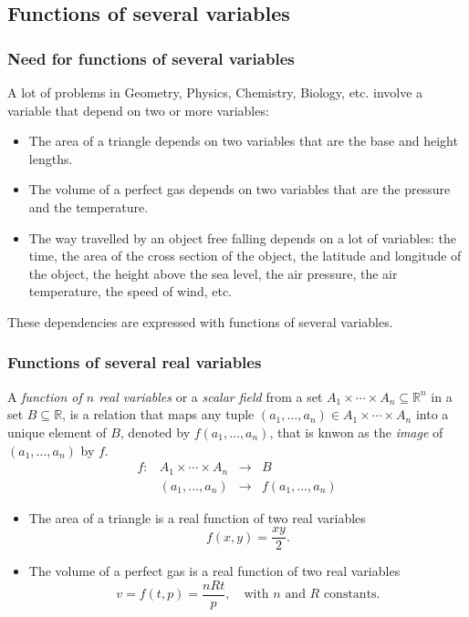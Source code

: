 \subsection{Functions of several variables}
\begin{frame}
\frametitle{Need for functions of several variables}
A lot of problems in Geometry, Physics, Chemistry, Biology, etc. involve a variable that depend on two or more variables:
\begin{itemize}
\item The area of a triangle depends on two variables that are the base and height lengths.
\item The volume of a perfect gas depends on two variables that are the pressure and the temperature.
\item The way travelled by an object free falling depends on a lot of variables: the time, the area of the cross section of the object, the latitude and longitude of the object, the height above the sea level, the air pressure, the air temperature, the speed of wind, etc.
\end{itemize}
These dependencies are expressed with functions of several variables.
\end{frame}


\begin{frame}
\frametitle{Functions of several real variables}
\begin{definition}
A \emph{function of $n$ real variables} or a \emph{scalar field} from a set $A_1\times \cdots \times A_n\subseteq \mathbb{R}^n$ in a set $B\subseteq \mathbb{R}$, is a relation that maps any tuple $(a_1,\ldots,a_n)\in A_1\times \cdots\times A_n$ into a unique element of $B$, denoted by $f(a_1,\ldots,a_n)$, that is knwon as the \emph{image} of $(a_1,\ldots,a_n)$ by $f$.
\[
\begin{array}{lccc}
f: & A_1\times\cdots\times A_n & \longrightarrow & B\\
   &(a_1,\ldots,a_n) & \longrightarrow & f(a_1,\ldots,a_n)
\end{array}
\]
\end{definition}

\begin{itemize}
\item The area of a triangle is a real function of two real variables
\[ f(x,y)=\frac{xy}{2}.\]
\item The volume of a perfect gas is a real function of two real variables
\[
v=f(t,p)=\frac{nRt}{p},\quad \mbox{with $n$ and $R$ constants.}
\]
\end{itemize}
\end{frame}


